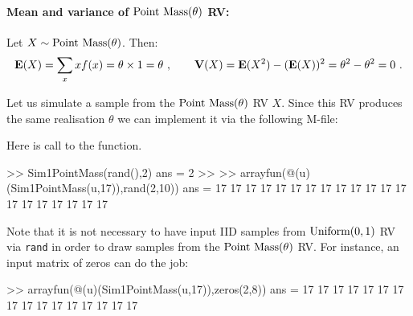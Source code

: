 \paragraph{Mean and variance of $\pointmass(\theta)$ RV:}
Let $X \sim \mbox{{\rm Point~Mass}}(\theta)$.  Then:
\[
\mathbf{E}(X) = \sum_{x} x f(x) = \theta \times 1 = \theta \ , \qquad
\mathbf{V}(X) = \mathbf{E}(X^2) - (\mathbf{E}(X))^2 = \theta^2 - \theta^2 = 0 \ .
\]
\begin{simulation}[$\pointmass(\theta)$]\label{SIM:PointMass}
Let us simulate a sample from the $\pointmass(\theta)$ RV $X$.  Since this RV produces the same realisation $\theta$ we can implement it via the following M-file:

Here is call to the function.
\begin{VrbM}
>> Sim1PointMass(rand(),2)
ans =     2
>> %
>> arrayfun(@(u)(Sim1PointMass(u,17)),rand(2,10))
ans =
    17    17    17    17    17    17    17    17    17    17
    17    17    17    17    17    17    17    17    17    17
\end{VrbM}
Note that it is not necessary to have input IID samples from $\mbox{{\rm Uniform}}(0,1)$ RV via {\tt rand} in order to draw samples from the $\pointmass(\theta)$ RV.  For instance, an input matrix of zeros can do the job:
\begin{VrbM}
>> arrayfun(@(u)(Sim1PointMass(u,17)),zeros(2,8))
ans =
    17    17    17    17    17    17    17    17
    17    17    17    17    17    17    17    17
\end{VrbM}
\end{simulation}



